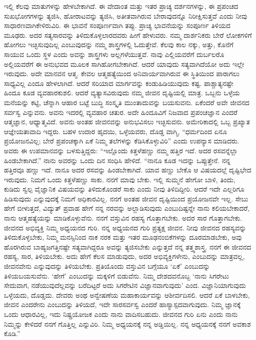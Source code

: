 \eject

ಇಲ್ಲಿ ಕೆಲವು ಮಾತುಗಳನ್ನು ಹೇಳಬೇಕಾಗಿದೆ. ಈ ವೇದಾಂತ ಮತ್ತು ಇತರ ಪ್ರಾಚ್ಯ ದರ್ಶನಗಳನ್ನು, ಈ ಪ್ರಪಂಚದ ಸುಖಭೋಗಗಳನ್ನು ತ್ಯಜಿಸಿ, ಹೋರಾಟವನ್ನು ತ್ಯಜಿಸಿ, ಅತೀತವಾಗಿರುವ ಬೇರಾವುದನ್ನೊ ನಿರೀಕ್ಷಿಸುತ್ತವೆ ಎಂದು ನೀವು ಸಾಧಾರಣವಾಗಿ\break ಕೇಳಿರುವಿರಿ. ಈ ಭಾವನೆ ಸಂಪೂರ್ಣವಾಗಿ ತಪ್ಪು. ಪ್ರಾಚ್ಯ ಭಾವನೆಯನ್ನು ಸಂಪೂರ್ಣ ತಿಳಿಯದ ಮೂಢರು. ಅದರ ಸತ್ಯಸಾರವನ್ನು ತಿಳಿದುಕೊಳ್ಳಲಾರದವರು ಹೀಗೆ ಹೇಳುವರು. ನಮ್ಮ ದಾರ್ಶನಿಕರು ಬೇರೆ ಲೋಕಗಳಿಗೆ ಹೋಗಲು ಇಚ್ಛಿಸುವುದಿಲ್ಲ ಎಂಬುವುದನ್ನು ನಮ್ಮ ಶಾಸ್ತ್ರಗಳಲ್ಲಿ ಓದುತ್ತೇವೆ. ಕೆಲವು ಕಾಲ ನಕ್ಕು, ಅತ್ತು, ಕೊನೆಗೆ ಸಾಯುವ ಒಂದು ಸ್ಥಳ ಎಂದು ಅವನ್ನು ಶಾಸ್ತ್ರಗಳು ಅಲ್ಲಗಳೆಯುತ್ತವೆ. ನಾವು ಎಲ್ಲಿಯವರೆಗೆ ದುರ್ಬಲರೊ ಅಲ್ಲಿಯವರೆಗೆ ಈ ಅನುಭವದ ಮೂಲಕ ಸಾಗಿಹೋಗಬೇಕಾಗಿದೆ. ಆದರೆ ಯಾವುದು ಸತ್ಯವಾಗಿದೆಯೋ ಅದು ಇಲ್ಲೇ ಇರುವುದು. ಅದೇ ಮಾನವನ ಆತ್ಮ. ಕೇವಲ ಆತ್ಮಹತ್ಯೆಯಿಂದ ಅನಿವಾರ್ಯವಾಗಿರುವ ಈ ಸ್ಥಿತಿಯಿಂದ ಪಾರಾಗಲು ಸಾಧ್ಯವಿಲ್ಲ ಎಂದೂ ಹೇಳಲಾಗಿದೆ. ಆದರೆ ಸರಿಯಾದ ಮಾರ್ಗವನ್ನು ಕಂಡುಹಿಡಿಯುವುದು ಕಷ್ಟ. ಪಾಶ್ಚಾತ್ಯನಷ್ಟೇ ಹಿಂದೂ ಕೂಡ ವ್ಯವಹಾರಕುಶಲಿ. ಆದರೆ ವ್ಯತ್ಯಾಸವಿರುವುದು ನಮ್ಮ ಜೀವನ ದೃಷ್ಟಿಯಲ್ಲಿ ಮಾತ್ರ. ಒಬ್ಬನು ಒಳ್ಳೆಯ ಮನೆಯನ್ನು ಕಟ್ಟಿ, ಚೆನ್ನಾಗಿ ಆಹಾರ ಬಟ್ಟೆ ಬುದ್ಧಿ ಸಂಸ್ಕೃತಿ ಮುಂತಾದುವನ್ನು ಬಯಸುವನು. ಏಕೆಂದರೆ ಅವೇ ಜೀವನದ ಸರ್ವಸ್ವ ಎನ್ನುವನು. ಅವನು ಇದರಲ್ಲಿ ವ್ಯವಹಾರ ಚತುರ. ಅದೇ ಹಿಂದೂವಿಗೆ ನಿಜವಾದ ಪ್ರಪಂಚಜ್ಞಾನ ಎಂದರೆ ಆತ್ಮಜ್ಞಾನ, ಆಧ್ಯಾತ್ಮವಿದೆ. ಅವನು ಅಂತಹ ಜೀವನವನ್ನು ಅನುಭವಿಸಲು ಇಚ್ಛಿಸುವನು. ಅಮೇರಿಕಾದಲ್ಲಿ ಒಬ್ಬ ಪ್ರಖ್ಯಾತ ಆಜ್ಞೇಯತಾವಾದಿ ಇದ್ದರು. ಬಹಳ ಉದಾರ ಹೃದಯಿ, ಒಳ್ಳೆಯವರು, ದೊಡ್ಡ ವಾಗ್ಮಿ, “ಧರ್ಮದಿಂದ ಏನೂ ಪ್ರಯೋಜನವಿಲ್ಲ; ಬೇರೆ ಪ್ರಪಂಚಕ್ಕಾಗಿ ಏಕೆ ನಿಮ್ಮ ತಲೆಗಳನ್ನು ಕೆಡಿಸಿಕೊಳ್ಳುವಿರಿ” ಎಂದು ಉಪನ್ಯಾಸ ಮಾಡಿದರು. ಅವರು ಈ ಉಪಮಾನವನ್ನು ಬಳಸುತ್ತಿದ್ದರು: “ಇಲ್ಲೊಂದು ಕಿತ್ತಳೆಹಣ್ಣು ನಮ್ಮ ಹತ್ತಿರ ಇದೆ. ಅದರ ರಸವನ್ನೆಲ್ಲಾ ಹಿಂಡಬೇಕಾಗಿದೆ.” ನಾನು ಅವರನ್ನು ಒಂದು ದಿನ ಸಂಧಿಸಿ ಹೇಳಿದೆ. “ನಾನೂ ಕೂಡ ಇದನ್ನು ಒಪ್ಪುತ್ತೇನೆ. ನನ್ನ ಹತ್ತಿರವೂ ಹಣ್ಣು ಇದೆ. ನಾನೂ ಅದರ ರಸವನ್ನು ಹಿಂಡಬೇಕಾಗಿದೆ. ಯಾವ ಹಣ್ಣು ಬೇಕೊ ಆ ವಿಷಯದಲ್ಲೆ ದೃಷ್ಟಿಭೇದ ಇರುವುದು. ನಿಮಗೆ ಒಂದು ಕಿತ್ತಳೆಹಣ್ಣು ಸಾಕು. ನನಗೆ ಮಾವು ಬೇಕು. ಇಲ್ಲಿ ಸುಮ್ಮನೆ ಹೇಗೋ ಬಾಳಿ, ತಿಂದು, ಕುಡಿದು ಸ್ವಲ್ಪ ವೈಜ್ಞಾನಿಕ ವಿಷಯವನ್ನು ತಿಳಿದುಕೊಂಡರೆ ಸಾಕು ಎಂದು ನೀವು ತಿಳಿದಿದ್ದೀರಿ. ಆದರೆ ಇದೇ ಎಲ್ಲರಿಗೂ ಹಿಡಿಸುವುದು ಎನ್ನುವುದಕ್ಕೆ ನಿಮಗೆ ಅಧಿಕಾರವಿಲ್ಲ. ನನಗೆ ಅಂತಹ ಜೀವನ ದೃಷ್ಟಿಯಿಂದ ಪ್ರಯೋಜನವೇ ಇಲ್ಲ. ಸೇಬು ಹೇಗೆ ಬೀಳುತ್ತದೆ, ವಿದ್ಯುತ್​ ಪ್ರವಾಹ ಹೇಗೆ ನನ್ನ ನರವನ್ನು ಅಲ್ಲಾಡಿಸುವುದು ಎಂಬುದಿಷ್ಟನ್ನೇ ನಾನು ಕಲಿಯಬೇಕಾದರೆ, ನಾನು ಆತ್ಮಹತ್ಯೆಯನ್ನು ಮಾಡಿಕೊಳ್ಳುವೆನು. ನನಗೆ ವಸ್ತುವಿನ ರಹಸ್ಯ ಗೊತ್ತಾಗಬೇಕು. ಅದರ ಸಾರ ಗೊತ್ತಾಗಬೇಕು. ಜೀವನದ ಅಭಿವ್ಯಕ್ತಿ ನಿಮ್ಮ ಅಧ್ಯಯನದ ಗುರಿ. ನನ್ನ ಅಧ್ಯಯನದ ಗುರಿ ಪ್ರತ್ಯಕ್ಷ ಜೀವನ. ನೀವು ಜೀವನದ ರಹಸ್ಯವನ್ನು ತಿಳಿದುಕೊಳ್ಳಬೇಕು, ನಿಮ್ಮ ಮನಸ್ಸಿನಿಂದ ನಾಕ ನರಕ ಮತ್ತು ಇತರ ಮೂಢನಂಬಿಕೆಗಳನ್ನು ದೂರಮಾಡಬೇಕು, ಅವು ಹೊರಗಿರುವ ಬಾಹ್ಯಜಗತ್ತಿನಷ್ಟೇ ಸತ್ಯವಾಗಿದ್ದರೂ ಅವನ್ನು ತ್ಯಜಿಸಬೇಕು ಎನ್ನುತ್ತದೆ ನನ್ನ ತತ್ತ್ವಶಾಸ್ತ್ರ. ನನಗೆ ಈ ಜೀವನದ ರಹಸ್ಯ, ಸಾರ, ತಿಳಿಯಬೇಕು. ಅದು ಹೇಗೆ ಕೆಲಸ ಮಾಡುವುದು, ಅದರ ಅಭಿವ್ಯಕ್ತಿಗಳೇನು, ಎಂಬುದನ್ನು ಮಾತ್ರವಲ್ಲ, ಜೀವನವೇನು ಎನ್ನುವುದನ್ನು ತಿಳಿಯಬೇಕು. ಪ್ರತಿಯೊಂದು ವಸ್ತುವಿನ ಬಗ್ಗೆಯೂ ‘ಏಕೆ’ ಎಂಬುದನ್ನು ತಿಳಿಯಬಯಸುವೆನು. ‘ಹೇಗೆ’ ಎಂಬುದನ್ನು ಮಕ್ಕಳಿಗೆ ಬಿಡುವೆನು. ನಿಮ್ಮ ದೇಶದವನೊಬ್ಬ ‘ನಾನು ಸಿಗರೇಟು ಸೇದುವಾಗ, ನಡೆಯುವುದೆಲ್ಲವನ್ನು ಬರೆದಿಟ್ಟರೆ ಅದು ಸಿಗರೇಟಿನ ವಿಜ್ಞಾನವಾಗುವುದು’ ಎಂದ. ವಿಜ್ಞಾನಿಯಾಗುವುದು ಒಳ್ಳೆಯದು, ದೊಡ್ಡದು. ದೇವರು ಅಂಥ ಅನ್ವೇಷಣೆಯ ಮಹಾಕಾರ್ಯವನ್ನು ಆಶೀರ್ವದಿಸಲಿ. ಆದರೆ ಏಕೆ ಬಾಳಬೇಕು, ಜೀವನ ಎಂದರೇನು ಎಂಬುದನ್ನು ತಿಳಿಯದೆ, ಇದೇ ಸಾರಸರ್ವಸ್ವ ಎಂದರೆ ಹಾಸ್ಯಾಸ್ಪದವಾಗುವುದು. ನಿಮ್ಮ ಜ್ಞಾನಕ್ಕೆ ಒಂದು ಆಧಾರವಿಲ್ಲ, ಇದು ನಿಷ್ಪ್ರಯೋಜಕ ಎಂದು ನಾನು ವಾದಿಸಬಹುದು. ಜೀವನದ ಗುರಿ ಏನು ಎಂದು ನಾನು ನಿಮ್ಮನ್ನು ಕೇಳಿದರೆ ನನಗೆ ಗೊತ್ತಿಲ್ಲ ಎನ್ನುವಿರಿ. ನಿಮ್ಮ ಅಧ್ಯಯನಕ್ಕೆ ನನ್ನ ಅಡ್ಡಿಯಿಲ್ಲ. ನನ್ನ ಅಧ್ಯಯನಕ್ಕೆ ನನಗೆ ಅವಕಾಶ ಕೊಡಿ.”

